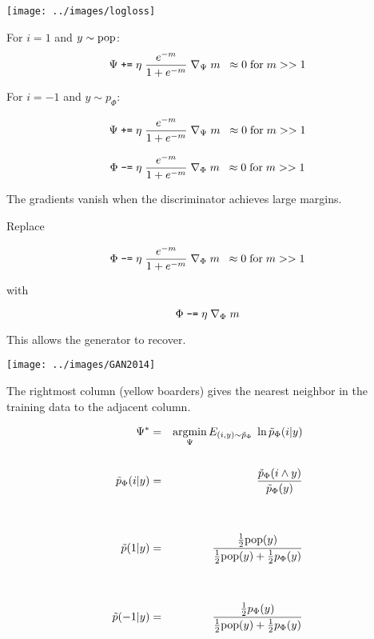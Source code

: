 {\centerline{\texttt{[image: ../images/logloss]}}


For $i = 1$ and $y \sim \mathrm{pop}$:
$$\Psi \;\mbox{\tt +=} \; \eta\;\frac{e^{-m}}{1 + e^{-m}}\;\nabla_\Psi \; m \;\;\approx 0 \;\mbox{for}\;m >> 1$$

\vfill
For $i = -1$ and $y \sim p_\Phi$:

$$\Psi \;\mbox{\tt +=} \; \eta\;\frac{e^{-m}}{1 + e^{-m}}\;\nabla_\Psi\;m \;\;\approx 0 \;\mbox{for}\;m >> 1$$

\vfill
$$\Phi \;\mbox{\tt -=} \; \eta\;\frac{e^{-m}}{1 + e^{-m}}\;\nabla_\Phi\;m \;\;\approx 0 \;\mbox{for}\;m >> 1$$

\vfill
The gradients vanish when the discriminator achieves large margins.


Replace

$$\Phi \;\mbox{\tt -=} \; \eta\;\frac{e^{-m}}{1 + e^{-m}}\;\nabla_\Phi\; m \;\;\approx 0 \;\mbox{for}\;m >> 1$$

\vfill
with

$$\Phi \;\mbox{\tt -=} \; \eta\;\nabla_\Phi\;m$$

\vfill
This allows the generator to recover.

\centerline{\texttt{[image: ../images/GAN2014]}}
The rightmost column (yellow boarders) gives the nearest neighbor in the training data to the adjacent column.


\begin{eqnarray*}
\Psi^* & = & \operatorname*{argmin}_\Psi  E_{(i,y) \sim \tilde{p}_\Phi}\; \ln \tilde{p}_\Phi(i|y) \\
\\
\tilde{p}_\Phi(i|y) & = & \frac{\tilde{p}_\Phi(i \wedge y)}{\tilde{p}_\Phi(y)} \\
\\
\\
\tilde{p}(1|y) & = & \frac{\frac{1}{2}\mathrm{pop}(y)}{\frac{1}{2}\mathrm{pop}(y) + \frac{1}{2}p_\Phi(y)} \\
\\
\\
\tilde{p}(-1|y) & = & \frac{\frac{1}{2}p_\Phi(y)}{\frac{1}{2}\mathrm{pop}(y) + \frac{1}{2}p_\Phi(y)}
\end{eqnarray*}


}
